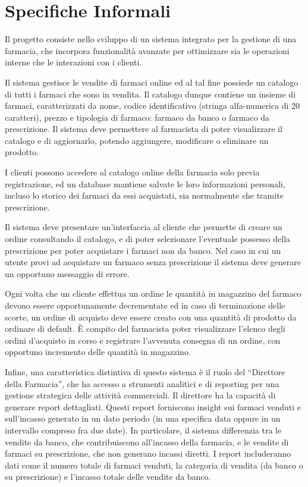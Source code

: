 \chapter{Specifiche Informali}

Il progetto consiste nello sviluppo di un sistema integrato per la gestione di una farmacia, che incorpora funzionalità avanzate per ottimizzare sia le operazioni interne che le interazioni con i clienti.

\noindent Il sistema gestisce le vendite di farmaci online ed al tal fine possiede un catalogo di tutti i farmaci che sono in vendita. Il catalogo dunque contiene un insieme di farmaci, caratterizzati da nome, codice identificativo (stringa alfa-numerica di 20 caratteri), prezzo e tipologia di farmaco: farmaco da banco o farmaco da prescrizione. Il sistema deve permettere al farmacista di poter visualizzare il catalogo e di aggiornarlo, potendo aggiungere, modificare o eliminare un prodotto.

\noindent I clienti possono accedere al catalogo online della farmacia solo previa registrazione, ed un database mantiene salvate le loro informazioni personali, incluso lo storico dei farmaci da essi acquistati, sia normalmente che tramite prescrizione.

\noindent Il sistema deve presentare un'interfaccia al cliente che permette di creare un ordine consultando il catalogo, e di poter selezionare l'eventuale possesso della prescrizione per poter acquistare i farmaci non da banco. Nel caso in cui un utente provi ad acquistare un farmaco senza prescrizione il sistema deve generare un opportuno messaggio di errore.

\noindent Ogni volta che un cliente effettua un ordine le quantità in magazzino del farmaco devono essere opportunamente decrementate ed in caso di terminazione delle scorte, un ordine di acquisto deve essere creato con una quantità di prodotto da ordinare di default. \`E compito del farmacista poter visualizzare l'elenco degli ordini d'acquisto in corso e registrare l'avvenuta consegna di un ordine, con opportuno incremento delle quantità in magazzino.

\noindent Infine, una caratteristica distintiva di questo sistema è il ruolo del ``Direttore della Farmacia'', che ha accesso a strumenti analitici e di reporting per una gestione strategica delle attività commerciali. Il direttore ha la capacità di generare report dettagliati. Questi report forniscono insight sui farmaci venduti e sull'incasso generato in un dato periodo (in una specifica data oppure in un intervallo compreso fra due date). In particolare, il sistema differenzia tra le vendite da banco, che contribuiscono all'incasso della farmacia, e le vendite di farmaci su prescrizione, che non generano incassi diretti. I report includeranno dati come il numero totale di farmaci venduti, la categoria di vendita (da banco o su prescrizione) e l'incasso totale delle vendite da banco.
